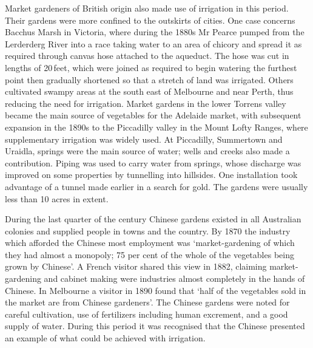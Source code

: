 Market gardeners of British origin also made use of irrigation in this
period.  Their gardens were more confined to the outskirts of cities.
One case concerns Bacchus Marsh  in Victoria,
 where during the 1880s Mr Pearce pumped from the
Lerderderg River  into a race taking water to
an area of chicory and spread it as required through canvas hose
attached to the aqueduct.  The hose was cut in lengths of 20\,feet,
which were joined as required to begin watering the furthest point
then gradually shortened so that a stretch of land was irrigated.
Others cultivated swampy areas at the south east of Melbourne
 and near
Perth,  thus reducing the need for irrigation.
Market gardens in the lower Torrens valley 
became the main source of vegetables for the Adelaide market,
 with subsequent expansion in the 1890s to the
Piccadilly valley
 in the Mount Lofty Ranges,
 where supplementary irrigation was widely used.
At Piccadilly,  Summertown 
and Uraidla,
 springs were the
main source of water; wells and creeks also made a contribution.
Piping was used to carry water from springs, whose discharge was
improved on some properties by tunnelling into hillsides.  One
installation took advantage of a tunnel made earlier in a search for
gold.  The gardens were usually less than 10 acres in
extent.

During the last quarter of the century Chinese gardens existed in all
Australian colonies and supplied people in towns and the country.  By
1870 the industry which afforded the Chinese most employment was
`market-gardening of which they had almost a monopoly; 75 per cent of
the whole of the vegetables being grown by Chinese'.  A French visitor
shared this view in 1882, claiming market-gardening and cabinet making
were industries almost completely in the hands of Chinese.  In
Melbourne a visitor in 1890 found that `half of the vegetables sold in
the market are from Chinese gardeners'. The Chinese gardens were noted
for careful cultivation, use of fertilizers including human
excrement, and a good supply of water.  During
this period it was recognised that the Chinese presented an example of
what could be achieved with irrigation.

